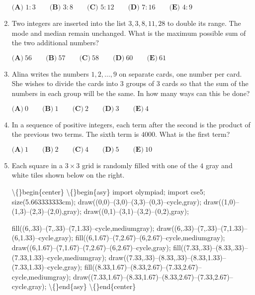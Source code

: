 \documentclass{article}
\begin{document}
\begin{enumerate}[label=\arabic*., itemsep=0.5em]
\(\textbf{(A) } 1 : 3 \qquad \textbf{(B) } 3 : 8 \qquad \textbf{(C) } 5 : 12 \qquad \textbf{(D) } 7 : 16 \qquad \textbf{(E) } 4 : 9\)\par \vspace{0.5em}\item Two integers are inserted into the list \(3,3,8,11,28\) to double its range. The mode and median remain unchanged. What is the maximum possible sum of the two additional numbers?

\(\textbf{(A)}\ 56 \qquad \textbf{(B)}\ 57 \qquad \textbf{(C)}\ 58 \qquad \textbf{(D)}\ 60 \qquad \textbf{(E)}\ 61\)\par \vspace{0.5em}\item Alina writes the numbers \(1, 2, \dots , 9\) on separate cards, one number per card. She wishes to divide the cards into \(3\) groups of \(3\) cards so that the sum of the numbers in each group will be the same. In how many ways can this be done?

\(\textbf{(A)}\ 0 \qquad \textbf{(B)}\ 1 \qquad \textbf{(C)}\ 2 \qquad \textbf{(D)}\ 3 \qquad \textbf{(E)}\ 4\)\par \vspace{0.5em}\item In a sequence of positive integers, each term after the second is the product of the previous two terms. The sixth term is \(4000\). What is the first term?

\(\textbf{(A)}\ 1 \qquad \textbf{(B)}\ 2 \qquad \textbf{(C)}\ 4 \qquad \textbf{(D)}\ 5 \qquad \textbf{(E)}\ 10\)\par \vspace{0.5em}\item Each square in a \(3 \times 3\) grid is randomly filled with one of the \(4\) gray and white tiles shown below on the right. 

\textbackslash\{\}begin\{center\}
\textbackslash\{\}begin\{asy\}
import olympiad;
import cse5;
size(5.663333333cm);
draw((0,0)--(3,0)--(3,3)--(0,3)--cycle,gray);
draw((1,0)--(1,3)--(2,3)--(2,0),gray);
draw((0,1)--(3,1)--(3,2)--(0,2),gray);

fill((6,.33)--(7,.33)--(7,1.33)--cycle,mediumgray);
draw((6,.33)--(7,.33)--(7,1.33)--(6,1.33)--cycle,gray);
fill((6,1.67)--(7,2.67)--(6,2.67)--cycle,mediumgray);
draw((6,1.67)--(7,1.67)--(7,2.67)--(6,2.67)--cycle,gray);
fill((7.33,.33)--(8.33,.33)--(7.33,1.33)--cycle,mediumgray);
draw((7.33,.33)--(8.33,.33)--(8.33,1.33)--(7.33,1.33)--cycle,gray);
fill((8.33,1.67)--(8.33,2.67)--(7.33,2.67)--cycle,mediumgray);
draw((7.33,1.67)--(8.33,1.67)--(8.33,2.67)--(7.33,2.67)--cycle,gray);
\textbackslash\{\}end\{asy\}
\textbackslash\{\}end\{center\}


\end{enumerate}
\end{document}
